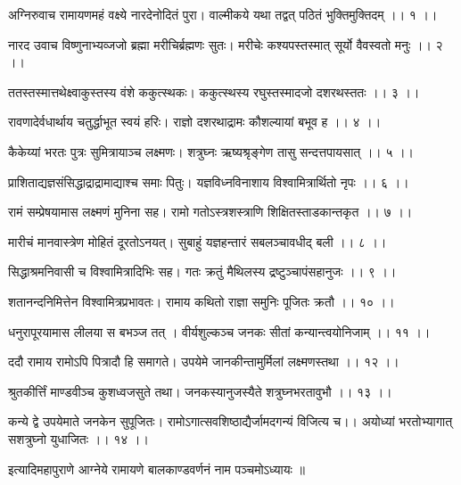 
\vakta{}
\shrota{}
\notes{}
\translink{}

\storymeta


अग्निरुवाच
रामायणमहं वक्ष्ये नारदेनोदितं पुरा।
वाल्मीकये यथा तद्वत् पठितं भुक्तिमुक्तिदम् ।। १ ।।

नारद उवाच
विष्णुनाभ्यव्जजो ब्रह्मा मरीचिर्ब्रह्मणः सुतः।
मरीचेः कश्यपस्तस्मात् सूर्यो वैवस्वतो मनुः ।। २ ।।

ततस्तस्मात्तथेक्ष्वाकुस्तस्य वंशे ककुत्स्थकः।
ककुत्स्थस्य रघुस्तस्मादजो दशरथस्ततः ।। ३ ।।

रावणादेर्वधार्थाय चतुर्द्धाभूत स्वयं हरिः।
राज्ञो दशरथाद्रामः कौशल्यायां बभूव ह ।। ४ ।।

कैकेय्यां भरतः पुत्रः सुमित्रायाञ्च लक्ष्मणः।
शत्रुघ्नः ऋष्यश्रृङ्गेण तासु सन्दत्तपायसात् ।। ५ ।।

प्राशिताद्यज्ञसंसिद्धाद्राद्रामाद्याश्च समाः पितुः।
यज्ञविध्नविनाशाय विश्वामित्रार्थितो नृपः ।। ६ ।।

रामं सम्प्रेषयामास लक्ष्मणं मुनिना सह।
रामो गतोऽस्त्रशस्त्राणि शिक्षितस्ताडकान्तकृत ।। ७ ।।

मारीचं मानवास्त्रेण मोहितं दूरतोऽनयत्।
सुबाहुं यज्ञहन्तारं सबलञ्चावधीद् बली ।। ८ ।।

सिद्धाश्रमनिवासी च विश्वामित्रादिभिः सह।
गतः क्रतुं मैथिलस्य द्रष्टुञ्चापंसहानुजः ।। ९ ।।

शतानन्दनिमित्तेन विश्वामित्रप्रभावतः।
रामाय कथितो राज्ञा समुनिः पूजितः क्रतौ ।। १० ।।

धनुरापूरयामास लीलया स बभञ्ज तत् ।
वीर्यशुल्कञ्च जनकः सीतां कन्यान्त्वयोनिजाम् ।। ११ ।।

ददौ रामाय रामोऽपि पित्रादौ हि समागते।
उपयेमे जानकीन्तामुर्मिलां लक्ष्मणस्तथा ।। १२ ।।

श्रुतकीर्त्तिं माण्डवीञ्च कुशध्वजसुते तथा।
जनकस्यानुजस्यैते शत्रुघ्नभरतावुभौ ।। १३ ।।

कन्ये द्वे उपयेमाते जनकेन सुपूजितः।
रामोऽगात्सवशिष्ठाद्यैर्जामदगन्यं विजित्य च।।
अयोध्यां भरतोभ्यागात् सशत्रुघ्नो युधाजितः ।। १४ ।।

इत्यादिमहापुराणे आग्नेये रामायणे बालकाण्डवर्णनं नाम पञ्चमोऽध्यायः ॥


